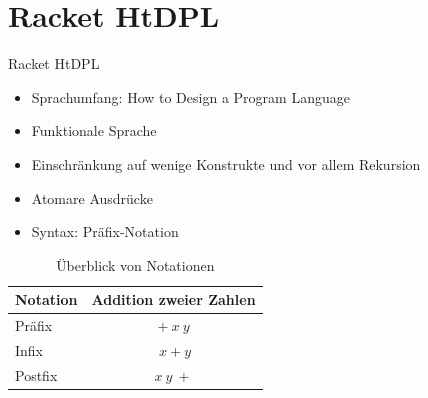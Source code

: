 \documentclass{../tuda-beamer}
\begin{document}
    \begin{frame}[allowframebreaks, c]
        
    \end{frame}

    \begin{frame}[c]
        
    \end{frame}

    \begin{frame}[allowframebreaks, c]
        
    \end{frame}

    \begin{frame}[allowframebreaks, c]
        
    \end{frame}

    \begin{frame}[allowframebreaks, c]
        
    \end{frame}

    \begin{frame}[allowframebreaks, c]
        
    \end{frame}


    \section{Racket HtDPL}
    \begin{frame}{Racket HtDPL}
        \begin{itemize}
            \item Sprachumfang: How to Design a Program Language
            \item Funktionale Sprache
            \item Einschränkung auf wenige Konstrukte und vor allem Rekursion
            \item Atomare Ausdrücke
            \item Syntax: Präfix-Notation
        \end{itemize}

        \begin{table}[h]
            \centering
            \begin{tabular}{lc}
                \toprule
                \textbf{Notation} & \textbf{Addition zweier Zahlen}
                \\
                \midrule
                Präfix & \(+ \ x \ y\)
                \\
                Infix & \(\ x + y\)
                \\
                Postfix & \(x \ y \ +\)
                \\
                \bottomrule
            \end{tabular}
            \caption{Überblick von Notationen}
        \end{table}
    \end{frame}
\end{document}
